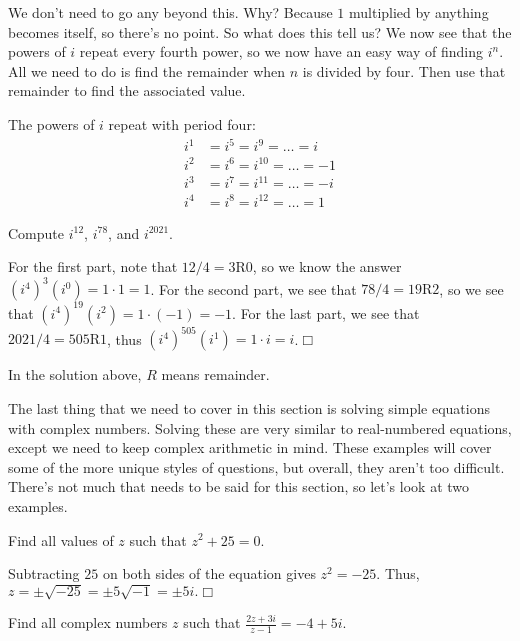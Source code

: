\documentclass[../book.tex]{subfiles}
\begin{document}
\noindent We don't need to go any beyond this.  Why?  Because $1$ multiplied by anything becomes itself, so there's no point.  So what does this tell us?  We now see that the powers of $i$ repeat every fourth power, so we now have an easy way of finding $i^n$.  All we need to do is find the remainder when $n$ is divided by four.  Then use that remainder to find the associated value.
\begin{note}
The powers of $i$ repeat with period four:
\begin{align*}
    i^1&=i^5=i^9 = \ldots=i \\
    i^2&=i^6=i^{10}=\ldots=-1 \\
    i^3&=i^7=i^{11}=\ldots=-i \\
    i^4&=i^8=i^{12}=\ldots=1
\end{align*}
\end{note}
\begin{example}
Compute $i^{12}$, $i^{78}$, and $i^{2021}$.
\end{example}
\begin{solution}
For the first part, note that $12/4=3\text{R}0$, so we know the answer $\left(i^4\right)^3\left(i^0\right)=1\cdot 1=1$.  For the second part, we see that $78/4=19\text{R}2$, so we see that $\left(i^4\right)^{19}\left(i^2\right)=1\cdot \left(-1\right)=-1$.  For the last part, we see that $2021/4=505\text{R}1$, thus $\left(i^4\right)^{505}\left(i^1\right)=1\cdot i=i$.$\Box$
\end{solution}
\begin{remark}
  In the solution above, $R$ means remainder.
\end{remark}
\noindent The last thing that we need to cover in this section is solving simple equations with complex numbers.  Solving these are very similar to real-numbered equations, except we need to keep complex arithmetic in mind.  These examples will cover some of the more unique styles of questions, but overall, they aren't too difficult.  There's not much that needs to be said for this section, so let's look at two examples.  
\begin{example}
Find all values of $z$ such that $z^2+25=0$.
\end{example}
\begin{solution}
Subtracting $25$ on both sides of the equation gives $z^2=-25$.  Thus, $z=\pm\sqrt{-25}=\pm 5\sqrt{-1}=\pm 5i.$$\Box$
\end{solution}
\begin{example}
Find all complex numbers $z$ such that $\displaystyle \frac{2z+3i}{z-1}=-4+5i$.
\end{example}
\end{document}
